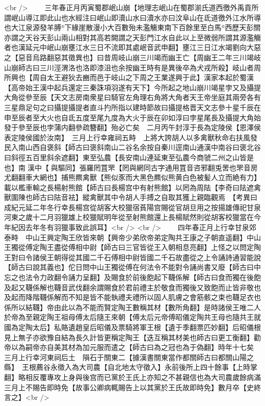 <br />
　　三年春正月丙寅蜀郡岷山崩【地理志岷山在蜀郡湔氏道西徼外禹貢所謂岷山導江即此山也水經注曰岷山即瀆山水曰瀆水亦曰汶阜山在氐道徼外江水所導也大江泉源發羊膊下緣崖散漫小大百數殆未濫觴東南下百餘里至白馬西歷天彭關亦謂之天谷天彭山兩山相對其高若闕謂之天彭門江水自此以上至微弱所謂其源濫觴者也漢延元中岷山崩壅江水三日不流即其處岷音武申翻】壅江三日江水竭劉向大惡之【惡音烏路翻惡其徵異也】曰昔周岐山崩三川竭而幽王亡【周幽王二年三川竭岐山崩師古曰三川涇渭洛也洛即漆沮也余按幽王時有是異後卒為犬戎所殺】岐山者周所興也【周自太王避狄去豳而邑于岐山之下周之王業遂興于此】漢家本起於蜀漢【高帝始王漢中起兵還定三秦誅項羽遂有天下】今所起之地山崩川竭星孛又及攝提大角從參至辰【天文志房南衆星曰騎官左角理右角將大角者天王帝坐庭其兩旁各有三星鼎足句之曰攝提攝提者直斗扚所指以建時節故曰攝提格晋天文志參十星千辰在申至辰者至大火也自氐五度至尾九度為大火于辰在卯如淳曰孛星尾長及攝提大角始發于參至辰也孛蒲内翻參疏簪翻】殆必亡矣　二月丙午封淳于長為定陵侯【恩澤侯表定陵侯國於汝南】　三月上行幸雍祠五畤　上將大誇胡人以多禽獸秋命右扶風發民入南山西自褒斜【師古曰褒斜南山二谷名余按自秦川逕南山通漢中南谷曰褒北谷曰斜徑五百里斜余遮翻】東至弘農【長安南山連延東至弘農今商虢二州之山皆是也】南漢中【與驅同】張羅罔罝罘【罔與網同古字通用罝音咨邪翻兎罟也罘音房尤翻翻車大網也】捕熊羆禽獸【熊似豕而大黑色羆似熊黄白色被髪人立而絶有力】載以檻車輸之長楊射熊館【師古曰長楊宫中有射熊館】以罔為周阹【李奇曰阹遮禽獸圍陳也師古曰阹音袪】縱禽獸其中令胡人手搏之自取其獲上親臨觀焉　【考異曰成紀元延二年冬行幸長楊宫從胡客大校獵宿萯陽宫賜從官胡旦用之按揚雄傳祀甘泉河東之歲十二月羽獵雄上校獵賦明年從至射熊館還上長楊賦然則從胡客校獵當在今年紀因去年冬有羽獵事致此誤耳】<br />
<br />
　　四年春正月上行幸甘泉郊泰畤　中山王興定陶王欣皆來朝【興帝少弟欣帝弟定陶共王康之子朝直遥翻】中山王獨從傅定陶王盡從傅相中尉【師古曰三官皆從王入朝相息亮翻】上怪之以問定陶王對曰令諸侯王朝得從其國二千石傅相中尉皆國二千石故盡從之上令誦詩通習能說【師古曰說其義也】佗日問中山王獨從傅在何法令不能對令誦尚書又廢【師古曰中忘之也法令力政翻令誦力呈翻】及賜食於前後飽起下韈係解【師古曰食而獨在後飽及起又韈係解也韈音武伐翻余謂賜食於君前禮主於敬食而獨後又致飽而止皆非敬也及起而降階韈係解而不知是皆不能執禮夫禮所以固人肌膚之會筋骸之束也韈足衣也係所以結韈】帝由此以為不能而賢定陶王數稱其材【數所角翻】是時諸侯王唯二人於帝為至親定陶王祖母傅太后隨王來朝【傅太后元帝傅昭儀定陶共王母也隨共王就國為定陶太后】私賂遺趙皇后昭儀及票騎將軍王根【遺于季翻票匹妙翻】后昭儀根見上無子亦欲豫自結為長久計皆更稱定陶王【迭互稱其材美也師古曰更工衡翻】勸帝以為嗣帝亦自美其材為加元服而遣之【師古曰為之冠也為于偽翻】時年十七矣　三月上行幸河東祠后土　隕石于關東二【據漢書關東當作都關師古曰都關山陽之縣】　王根薦谷永徵入為大司農【自北地太守徵入】永前後所上四十餘事【上時掌翻】略相反覆專攻上身與後宫而已黨於王氏上亦知之不甚親信也為大司農歲餘病滿三月上不賜告即時免【故事公卿病輒賜告上以其黨於王氏故即時免】數月卒【史終言之】<br />
